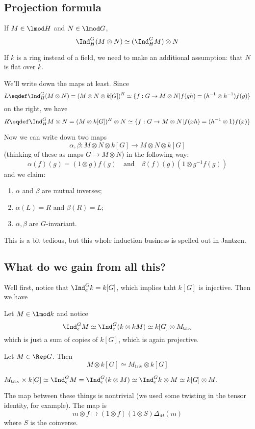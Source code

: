 \documentclass[12pt]{article}
\begin{document}
\subsection{Projection formula}
\begin{thm}
	If $M\in\lmod H$ and $N\in\lmod G$,
	\[\Ind_H^G(M\otimes N)\simeq (\Ind_H^GM)\otimes N\]
\end{thm}
\begin{rmk}
	If $k$ is a ring instead of a field, we need to make an additional assumption: that $N$ is flat over $k$.
\end{rmk}
\begin{prf}
	We'll write down the maps at least. Since 
	\[L\eqdef \Ind_H^G(M\otimes N)=(M\otimes N\otimes k[G])^H\simeq\{f:G\to M\otimes N|f(gh)=(h^{-1}\otimes h^{-1})f(g)\}\]
	on the right, we have 
	\[R\eqdef\Ind_H^GM\otimes N=(M\otimes k[G])^H\otimes N\simeq\{f:G\to M\otimes N|f(xh)=(h^{-1}\otimes 1)f(x)\}\]

	Now we can write down two maps 
	\[\alpha,\beta:M\otimes N\otimes k[G]\to M\otimes N\otimes k[G]\]
	(thinking of these as maps $G\to M\otimes N$) in the following way:
	\[\alpha(f)(g)=(1\otimes g)f(g)\quad\text{and}\quad \beta(f)(g)(1\otimes g^{-1}f(g))\]
	and we claim:
	\begin{enumerate}
		\item $\alpha$ and $\beta$ are mutual inverses;
		\item $\alpha(L)=R$ and $\beta(R)=L$;
		\item $\alpha,\beta$ are $G$-invariant.
	\end{enumerate}
\end{prf}
\begin{rmk}
	This is a bit tedious, but this whole induction business is spelled out in Jantzen.
\end{rmk}

\subsection{What do we gain from all this?}
Well first, notice that $\Ind_e^G k=k[G]$, which implies taht $k[G]$ is injective. Then we have 
\begin{cor}
	Let $M\in \lmod k$ and notice 
	\[\Ind_e^G M\simeq\Ind_e^G(k\otimes k M)\simeq k[G]\otimes M_\text{triv}\]
	which is just a sum of copies of $k[G]$, which is again projective.
\end{cor}
\begin{cor}
	Let $M\in \Rep G$. Then 
	\[M\otimes k[G]\simeq M_\text{triv}\otimes k[G]\]
\end{cor}
\begin{prf}
	$M_\text{triv}\times k[G]\simeq\Ind_e^G M=\Ind_e^G(k\otimes M)\simeq \Ind_e^Gk\otimes M\simeq k[G]\otimes M.$
\end{prf}
\begin{rmk}
	The map between these things is nontrivial (we used some twisting in the tensor identity, for example). The map is 
	\[m\otimes f\mapsto (1\otimes f)(1\otimes S)\Delta_M(m)\]
	where $S$ is the coinverse.
\end{rmk}
\end{document}
